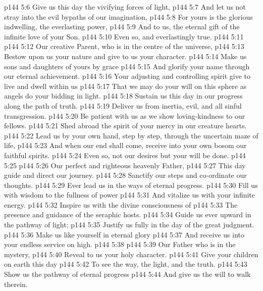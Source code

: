 \vs p144 5:6 Give us this day the vivifying forces of light,
\vs p144 5:7 \hsetoff And let us not stray into the evil bypaths of our imagination,
\vs p144 5:8 For yours is the glorious indwelling, the everlasting power,
\vs p144 5:9 \hsetoff And to us, the eternal gift of the infinite love of your Son.
\vs p144 5:10 Even so, and everlastingly true.
\vs p144 5:11 \separatorshort
\vs p144 5:12 Our creative Parent, who is in the centre of the universe,
\vs p144 5:13 \hsetoff Bestow upon us your nature and give to us your character.
\vs p144 5:14 Make us sons and daughters of yours by grace
\vs p144 5:15 \hsetoff And glorify your name through our eternal achievement.
\vs p144 5:16 Your adjusting and controlling spirit give to live and dwell within us
\vs p144 5:17 \hsetoff That we may do your will on this sphere as angels do your bidding in light.
\vs p144 5:18 Sustain us this day in our progress along the path of truth.
\vs p144 5:19 \hsetoff Deliver us from inertia, evil, and all sinful transgression.
\vs p144 5:20 Be patient with us as we show loving\hyp{}kindness to our fellows.
\vs p144 5:21 \hsetoff Shed abroad the spirit of your mercy in our creature hearts.
\vs p144 5:22 Lead us by your own hand, step by step, through the uncertain maze of life,
\vs p144 5:23 \hsetoff And when our end shall come, receive into your own bosom our faithful spirits.
\vs p144 5:24 Even so, not our desires but your will be done.
\vs p144 5:25 \separatorshort
\vs p144 5:26 Our perfect and righteous heavenly Father,
\vs p144 5:27 \hsetoff This day guide and direct our journey.
\vs p144 5:28 Sanctify our steps and co\hyp{}ordinate our thoughts.
\vs p144 5:29 \hsetoff Ever lead us in the ways of eternal progress.
\vs p144 5:30 Fill us with wisdom to the fullness of power
\vs p144 5:31 \hsetoff And vitalize us with your infinite energy.
\vs p144 5:32 Inspire us with the divine consciousness of
\vs p144 5:33 \hsetoff The presence and guidance of the seraphic hosts.
\vs p144 5:34 Guide us ever upward in the pathway of light;
\vs p144 5:35 \hsetoff Justify us fully in the day of the great judgment.
\vs p144 5:36 Make us like yourself in eternal glory
\vs p144 5:37 \hsetoff And receive us into your endless service on high.
\vs p144 5:38 \separatorshort
\vs p144 5:39 Our Father who is in the mystery,
\vs p144 5:40 \hsetoff Reveal to us your holy character.
\vs p144 5:41 Give your children on earth this day
\vs p144 5:42 \hsetoff To see the way, the light, and the truth.
\vs p144 5:43 Show us the pathway of eternal progress
\vs p144 5:44 \hsetoff And give us the will to walk therein.
